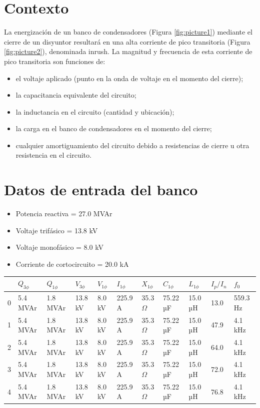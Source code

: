 \documentclass[a4paper]{article}
\begin{document}
	
	\section{Contexto}
	La energización de un banco de condensadores (Figura \ref{fig:picture1}) mediante el cierre de un disyuntor resultará en una alta corriente de pico transitoria (Figura \ref{fig:picture2}), denominada inrush. La magnitud y frecuencia de esta corriente de pico transitoria son funciones de:
	\begin{itemize}[label=\textendash]
		\item el voltaje aplicado (punto en la onda de voltaje en el momento del cierre);
		\item la capacitancia equivalente del circuito;
		\item la inductancia en el circuito (cantidad y ubicación);
		\item la carga en el banco de condensadores en el momento del cierre;
		\item cualquier amortiguamiento del circuito debido a resistencias de cierre u otra resistencia en el circuito.
	\end{itemize}
	
	\section{Datos de entrada del banco}
	\begin{itemize}[label=\textendash]
		\item Potencia reactiva  = 27.0 MVAr
		\item Voltaje trifásico  = 13.8 kV
		\item Voltaje monofásico  = 8.0 kV
		\item Corriente de cortocircuito  = 20.0 kA
	\end{itemize}
	
	\begin{center}
		\begin{tabular}{lllllllllll}
\toprule
 & $Q_{3\phi}$ & $Q_{1\phi}$ & $V_{3\phi}$ & $V_{1\phi}$ & $I_{1\phi}$ & $X_{1\phi}$ & $C_{1\phi}$ & $L_{1\phi}$ & $I_{p}/I_{n}$ & $f_{0}$ \\
\midrule
0 & 5.4 MVAr & 1.8 MVAr & 13.8 kV & 8.0 kV & 225.9 A & 35.3 $\Omega$ & 75.22 µF & 15.0 µH & 13.0 & 559.3 Hz \\
1 & 5.4 MVAr & 1.8 MVAr & 13.8 kV & 8.0 kV & 225.9 A & 35.3 $\Omega$ & 75.22 µF & 15.0 µH & 47.9 & 4.1 kHz \\
2 & 5.4 MVAr & 1.8 MVAr & 13.8 kV & 8.0 kV & 225.9 A & 35.3 $\Omega$ & 75.22 µF & 15.0 µH & 64.0 & 4.1 kHz \\
3 & 5.4 MVAr & 1.8 MVAr & 13.8 kV & 8.0 kV & 225.9 A & 35.3 $\Omega$ & 75.22 µF & 15.0 µH & 72.0 & 4.1 kHz \\
4 & 5.4 MVAr & 1.8 MVAr & 13.8 kV & 8.0 kV & 225.9 A & 35.3 $\Omega$ & 75.22 µF & 15.0 µH & 76.8 & 4.1 kHz \\
\bottomrule
\end{tabular}

	\end{center}
	
\end{document}
